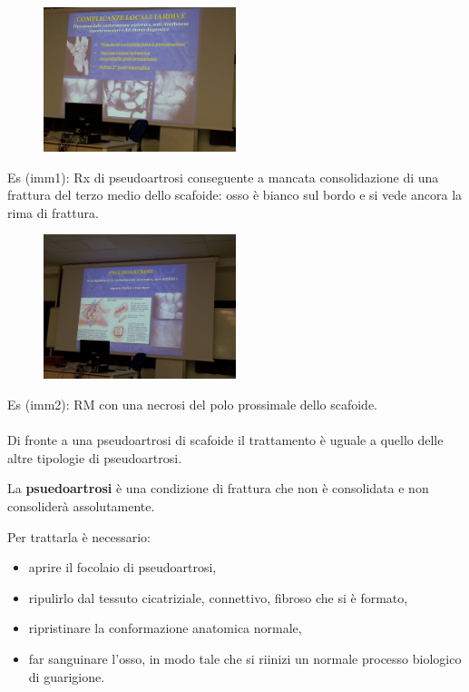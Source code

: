 \begin{figure}[!ht]
\centering
\includegraphics[width=0.5\textwidth]{004/image5.jpeg}
\end{figure}

Es (imm1): Rx di pseudoartrosi conseguente a mancata consolidazione di
una frattura del terzo medio dello scafoide: osso è bianco sul bordo e
si vede ancora la rima di frattura.

\begin{figure}[!ht]
\centering
\includegraphics[width=0.5\textwidth]{004/image6.jpeg}
\end{figure}

Es (imm2): RM con una necrosi del polo prossimale dello scafoide. 
\\\\
Di fronte a una pseudoartrosi di scafoide il trattamento è uguale a quello delle altre tipologie di pseudoartrosi.

La \textbf{psuedoartrosi} è una condizione di frattura che non è consolidata e non consoliderà assolutamente.

Per trattarla è necessario:

\begin{itemize}
\item
  aprire il focolaio di pseudoartrosi,
\item
  ripulirlo dal tessuto cicatriziale, connettivo, fibroso che si è formato,
\item
  ripristinare la conformazione anatomica normale,
\item
  far sanguinare l'osso, in modo tale che si riinizi un normale processo biologico di guarigione.
\end{itemize}


